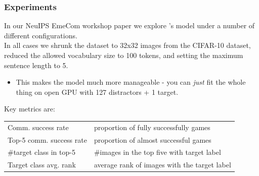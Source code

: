 \documentclass[\beamerclass,aspectratio=1610]{beamer}
\begin{document}
\begin{frame}
\frametitle{Experiments}
In our NeuIPS EmeCom workshop paper we explore \citeauthor{Havrylov2017}'s model under a number of different configurations.
\\[0.5em]
In all cases we shrunk the dataset to 32x32 images from the CIFAR-10 dataset, reduced the allowed vocabulary size to 100 tokens, and setting the maximum sentence length to 5.
\begin{itemize}
	\item This makes the model much more manageable - you can \emph{just} fit the whole thing on open GPU with 127 distractors + 1 target.\\[1em]
\end{itemize}
\pause
Key metrics are:  \\
\centering
\begin{tabular}{ll}
\hline
Comm. success rate & proportion of fully successfully games\\
Top-5 comm. success rate & proportion of almost successful games\\
\#target class in top-5 & \#images in the top five with target label\\
Target class avg. rank & average rank of images with the target label\\ \hline
\end{tabular}
\end{frame}
\end{document}
